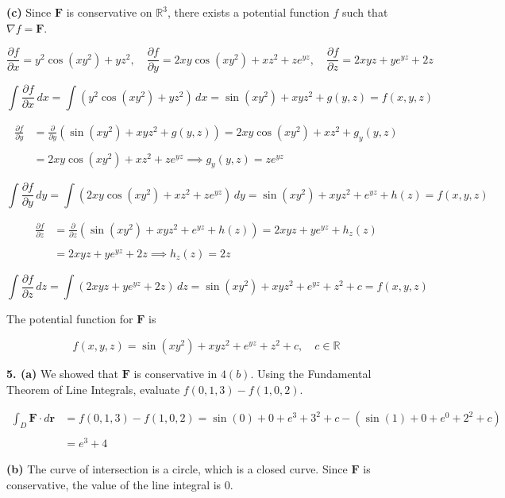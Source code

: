 \documentclass{article}
\begin{document}
\textbf{(c)} Since $\mathbf{F}$ is conservative on $\mathbb{R}^3$, there exists a potential function $f$ such that $\nabla f=\mathbf{F}$.

\[\frac{\partial f}{\partial x}=y^2\cos\left(xy^2\right)+yz^2,\quad\frac{\partial f}{\partial y}=2xy\cos\left(xy^2\right)+xz^2+z{e}^{yz},\quad\frac{\partial f}{\partial z}=2xyz+y{e}^{yz}+2z\]

\[\int\frac{\partial f}{\partial x}\,dx=\int\left(y^2\cos\left(xy^2\right)+yz^2\right)\,dx=\sin\left(xy^2\right)+xyz^2+g(y,z)=f(x,y,z)\]

\begin{align*}\frac{\partial f}{\partial y}&=\frac{\partial}{\partial y}\left(\sin\left(xy^2\right)+xyz^2+g(y,z)\right)=2xy\cos\left(xy^2\right)+xz^2+g_y(y,z)\\\\&=2xy\cos\left(xy^2\right)+xz^2+z{e}^{yz}\implies g_y(y,z)=z{e}^{yz}\end{align*}

\[\int\frac{\partial f}{\partial y}\,dy=\int\left(2xy\cos\left(xy^2\right)+xz^2+z{e}^{yz}\right)\,dy=\sin\left(xy^2\right)+xyz^2+{e}^{yz}+h(z)=f(x,y,z)\]

\begin{align*}\frac{\partial f}{\partial z}&=\frac{\partial}{\partial z}\left(\sin\left(xy^2\right)+xyz^2+{e}^{yz}+h(z)\right)=2xyz+y{e}^{yz}+h_z(z)\\\\&=2xyz+y{e}^{yz}+2z\implies h_z(z)=2z\end{align*}

\[\int\frac{\partial f}{\partial z}\,dz=\int\left(2xyz+y{e}^{yz}+2z\right)\,dz=\sin\left(xy^2\right)+xyz^2+{e}^{yz}+z^2+c=f(x,y,z)\]

The potential function for $\mathbf{F}$ is

\[\boxed{f(x,y,z)=\sin\left(xy^2\right)+xyz^2+{e}^{yz}+z^2+c,\quad c\in\mathbb{R}}\]

\textbf{5. (a)} We showed that $\mathbf{F}$ is conservative in $4(b)$. Using the Fundamental Theorem of Line Integrals, evaluate $f(0,1,3)-f(1,0,2)$.

\begin{align*}\int_D\mathbf{F}\cdot d\mathbf{r}&=f(0,1,3)-f(1,0,2)=\sin\left(0\right)+0+{e}^{3}+3^2+c-\left(\sin\left(1\right)+0+{e}^{0}+2^2+c\right)\\\\&=\boxed{{e}^3+4}\end{align*}

\textbf{(b)} The curve of intersection is a circle, which is a closed curve. Since $\mathbf{F}$ is conservative, the value of the line integral is $\boxed0$.
\end{document}
